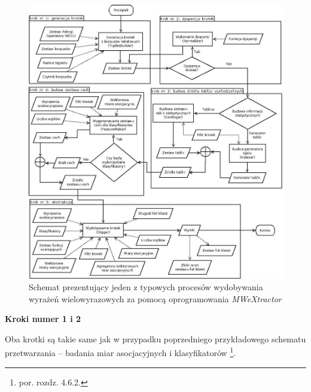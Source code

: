 \begin{figure}[h!]
\centering
\includegraphics[width=\textwidth]{charts/user_processing_scheme_extraction.jpg}
\caption [Przykładowy schemat procesu wydobywania wyrażeń wielowyrazowych]{Schemat prezentujący jeden z typowych procesów wydobywania wyrażeń wielowyrazowych za pomocą oprogramowania \emph{MWeXtractor}}
\label{user_processing_scheme_extraction}
\end{figure}

\par
\noindent\textbf{Kroki numer 1 i 2}
\par
Oba krotki są takie same jak w przypadku poprzedniego przykładowego schematu przetwarzania -- badania miar asocjacyjnych i klasyfikatorów \footnote{por. rozdz. 4.6.2.}.

